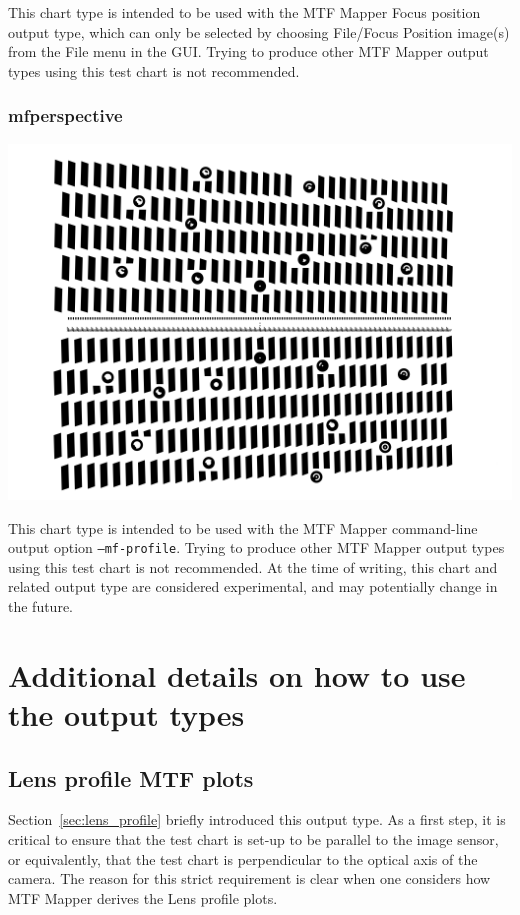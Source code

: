 \documentclass[a4paper]{article}
\begin{document}
This chart type is intended to be used with the MTF Mapper \textsf{Focus
position} output type, which can only be selected by choosing 
\textsf{File/Focus Position image(s)} from the \textsf{File} menu in the GUI.
Trying to produce other MTF Mapper output types using
this test chart is not recommended.

\subsubsection{mfperspective}

\parbox{\textwidth}{
\centering
\includegraphics[width=\textwidth]{figures/chart_mfperspective}
}

This chart type is intended to be used with the MTF Mapper command-line
output option \texttt{--mf-profile}. 
Trying to produce other MTF Mapper output types using this test chart is not recommended.
At the time of writing, this chart and related output type are considered
experimental, and may potentially change in the future.

\newpage

\section{Additional details on how to use the output types}

\subsection{Lens profile MTF plots}
Section~\ref{sec:lens_profile} briefly introduced this output type. As a
first step, it is critical to ensure that the test chart is set-up to be
parallel to the image sensor, or equivalently, that the test chart is
perpendicular to the optical axis of the camera. The reason for this strict
requirement is clear when one considers how MTF Mapper derives the
\textsf{Lens profile} plots.
\end{document}

